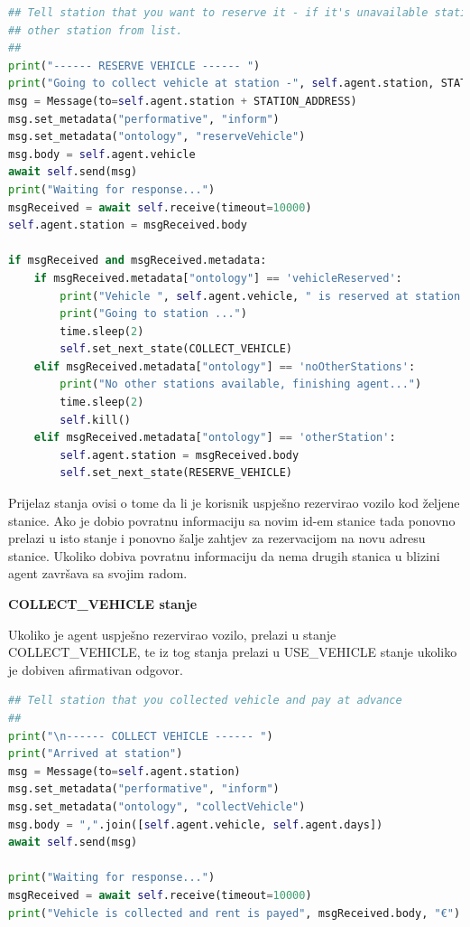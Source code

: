 \documentclass{foi}
\begin{document}
\begin{lstlisting}[language=Python]
 ## Tell station that you want to reserve it - if it's unavailable station will give you
## other station from list.
##
print("------ RESERVE VEHICLE ------ ")
print("Going to collect vehicle at station -", self.agent.station, STATION_ADDRESS)
msg = Message(to=self.agent.station + STATION_ADDRESS)
msg.set_metadata("performative", "inform")
msg.set_metadata("ontology", "reserveVehicle")
msg.body = self.agent.vehicle
await self.send(msg)
print("Waiting for response...")
msgReceived = await self.receive(timeout=10000)
self.agent.station = msgReceived.body

if msgReceived and msgReceived.metadata:
	if msgReceived.metadata["ontology"] == 'vehicleReserved':
		print("Vehicle ", self.agent.vehicle, " is reserved at station ", msgReceived.body)
		print("Going to station ...")
		time.sleep(2)
		self.set_next_state(COLLECT_VEHICLE)
	elif msgReceived.metadata["ontology"] == 'noOtherStations':
		print("No other stations available, finishing agent...")
		time.sleep(2)
		self.kill()
	elif msgReceived.metadata["ontology"] == 'otherStation':
		self.agent.station = msgReceived.body
		self.set_next_state(RESERVE_VEHICLE)
\end{lstlisting}

Prijelaz stanja ovisi o tome da li je korisnik uspješno rezervirao vozilo kod željene stanice. Ako je dobio povratnu informaciju sa novim id-em stanice tada ponovno prelazi u isto stanje i ponovno šalje zahtjev za rezervacijom na novu adresu stanice. Ukoliko dobiva povratnu informaciju da nema drugih stanica u blizini agent završava sa svojim radom.

\begin{flushleft}\textbf{COLLECT\_VEHICLE stanje}\end{flushleft}

Ukoliko je agent uspješno rezervirao vozilo, prelazi u stanje COLLECT\_VEHICLE, te iz tog stanja prelazi u USE\_VEHICLE stanje ukoliko je dobiven afirmativan odgovor.

\begin{lstlisting}[language=Python]
## Tell station that you collected vehicle and pay at advance
##
print("\n------ COLLECT VEHICLE ------ ")
print("Arrived at station")
msg = Message(to=self.agent.station)
msg.set_metadata("performative", "inform")
msg.set_metadata("ontology", "collectVehicle")
msg.body = ",".join([self.agent.vehicle, self.agent.days])
await self.send(msg)

print("Waiting for response...")
msgReceived = await self.receive(timeout=10000)
print("Vehicle is collected and rent is payed", msgReceived.body, "€")
\end{lstlisting}
\end{document}
